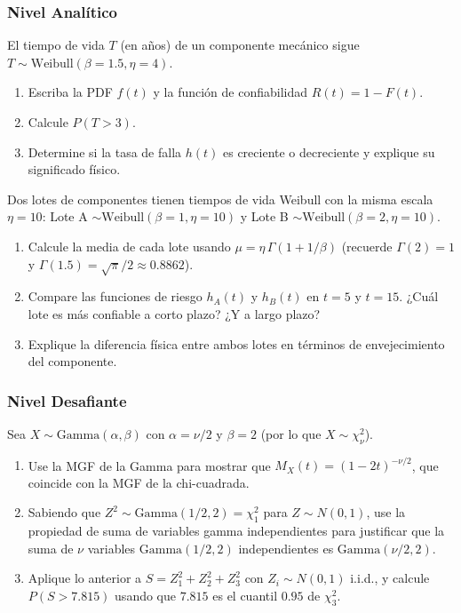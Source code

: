 \subsubsection*{Nivel Analítico}

\begin{problema}
	\label{prob:4.7.7}
	El tiempo de vida $T$ (en años) de un componente mecánico sigue $T \sim \text{Weibull}(\beta=1.5, \eta=4)$.
	\begin{enumerate}
		\item Escriba la PDF $f(t)$ y la función de confiabilidad $R(t) = 1 - F(t)$.
		\item Calcule $P(T > 3)$.
		\item Determine si la tasa de falla $h(t)$ es creciente o decreciente y explique su significado físico.
	\end{enumerate}
\end{problema}

\begin{problema}
	\label{prob:4.7.8}
	Dos lotes de componentes tienen tiempos de vida Weibull con la misma escala $\eta = 10$: Lote A $\sim \text{Weibull}(\beta=1, \eta=10)$ y Lote B $\sim \text{Weibull}(\beta=2, \eta=10)$.
	\begin{enumerate}
		\item Calcule la media de cada lote usando $\mu = \eta\,\Gamma(1+1/\beta)$ (recuerde $\Gamma(2)=1$ y $\Gamma(1.5) = \sqrt{\pi}/2 \approx 0.8862$).
		\item Compare las funciones de riesgo $h_{A}(t)$ y $h_{B}(t)$ en $t=5$ y $t=15$. ¿Cuál lote es más confiable a corto plazo? ¿Y a largo plazo?
		\item Explique la diferencia física entre ambos lotes en términos de envejecimiento del componente.
	\end{enumerate}
\end{problema}

\subsubsection*{Nivel Desafiante}

\begin{problema}
	\label{prob:4.7.9}
	Sea $X \sim \text{Gamma}(\alpha,\beta)$ con $\alpha = \nu/2$ y $\beta = 2$ (por lo que $X \sim \chi^{2}_{\nu}$).
	\begin{enumerate}
		\item Use la MGF de la Gamma para mostrar que $M_{X}(t) = (1-2t)^{-\nu/2}$, que coincide con la MGF de la chi-cuadrada.
		\item Sabiendo que $Z^{2} \sim \text{Gamma}(1/2, 2) = \chi^{2}_{1}$ para $Z \sim N(0,1)$, use la propiedad de suma de variables gamma independientes para justificar que la suma de $\nu$ variables $\text{Gamma}(1/2,2)$ independientes es $\text{Gamma}(\nu/2, 2)$.
		\item Aplique lo anterior a $S = Z_{1}^{2}+Z_{2}^{2}+Z_{3}^{2}$ con $Z_{i} \sim N(0,1)$ i.i.d., y calcule $P(S > 7.815)$ usando que $7.815$ es el cuantil $0.95$ de $\chi^{2}_{3}$.
	\end{enumerate}
\end{problema}

